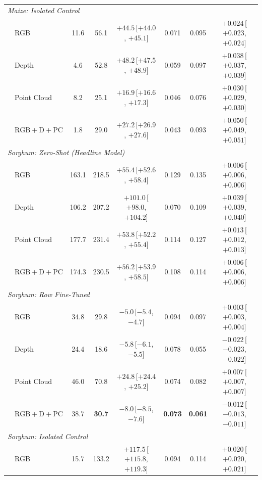 \documentclass[10pt,twocolumn,letterpaper]{article}
\begin{document}
\begin{table}[t]
\begin{tabular}{l l ccc ccc}
    \midrule
    \multicolumn{8}{l}{\emph{Maize: Isolated Control}} \\
    & RGB & 11.6 & 56.1 & $+44.5$\,{\tiny[$+44.0$, $+45.1$]} & 0.071 & 0.095 & $+0.024$\,{\tiny[$+0.023$, $+0.024$]} \\
    & Depth & 4.6 & 52.8 & $+48.2$\,{\tiny[$+47.5$, $+48.9$]} & 0.059 & 0.097 & $+0.038$\,{\tiny[$+0.037$, $+0.039$]} \\
    & Point Cloud & 8.2 & 25.1 & $+16.9$\,{\tiny[$+16.6$, $+17.3$]} & 0.046 & 0.076 & $+0.030$\,{\tiny[$+0.029$, $+0.030$]} \\
    & $\mathrm{RGB}+\mathrm{D}+\mathrm{PC}$ & 1.8 & 29.0 & $+27.2$\,{\tiny[$+26.9$, $+27.6$]} & 0.043 & 0.093 & $+0.050$\,{\tiny[$+0.049$, $+0.051$]} \\
    \midrule
    \multicolumn{8}{l}{\emph{Sorghum: Zero-Shot (Headline Model)}} \\
    & RGB & 163.1 & 218.5 & $+55.4$\,{\tiny[$+52.6$, $+58.4$]} & 0.129 & 0.135 & $+0.006$\,{\tiny[$+0.006$, $+0.006$]} \\
    & Depth & 106.2 & 207.2 & $+101.0$\,{\tiny[$+98.0$, $+104.2$]} & 0.070 & 0.109 & $+0.039$\,{\tiny[$+0.039$, $+0.040$]} \\
    & Point Cloud & 177.7 & 231.4 & $+53.8$\,{\tiny[$+52.2$, $+55.4$]} & 0.114 & 0.127 & $+0.013$\,{\tiny[$+0.012$, $+0.013$]} \\
    & $\mathrm{RGB}+\mathrm{D}+\mathrm{PC}$ & 174.3 & 230.5 & $+56.2$\,{\tiny[$+53.9$, $+58.5$]} & 0.108 & 0.114 & $+0.006$\,{\tiny[$+0.006$, $+0.006$]} \\
    \midrule
    \multicolumn{8}{l}{\emph{Sorghum: Row Fine-Tuned}} \\
    & RGB & 34.8 & 29.8 & $-5.0$\,{\tiny[$-5.4$, $-4.7$]} & 0.094 & 0.097 & $+0.003$\,{\tiny[$+0.003$, $+0.004$]} \\
    & Depth & 24.4 & 18.6 & $-5.8$\,{\tiny[$-6.1$, $-5.5$]} & 0.078 & 0.055 & $-0.022$\,{\tiny[$-0.023$, $-0.022$]} \\
    & Point Cloud & 46.0 & 70.8 & $+24.8$\,{\tiny[$+24.4$, $+25.2$]} & 0.074 & 0.082 & $+0.007$\,{\tiny[$+0.007$, $+0.007$]} \\
    & $\mathrm{RGB}+\mathrm{D}+\mathrm{PC}$ & 38.7 & \textbf{30.7} & $-8.0$\,{\tiny[$-8.5$, $-7.6$]} & \textbf{0.073} & \textbf{0.061} & $-0.012$\,{\tiny[$-0.013$, $-0.011$]} \\
    \midrule
    \multicolumn{8}{l}{\emph{Sorghum: Isolated Control}} \\
    & RGB & 15.7 & 133.2 & $+117.5$\,{\tiny[$+115.8$, $+119.3$]} & 0.094 & 0.114 & $+0.020$\,{\tiny[$+0.020$, $+0.021$]} \\

\end{tabular}
\end{table}
\end{document}
